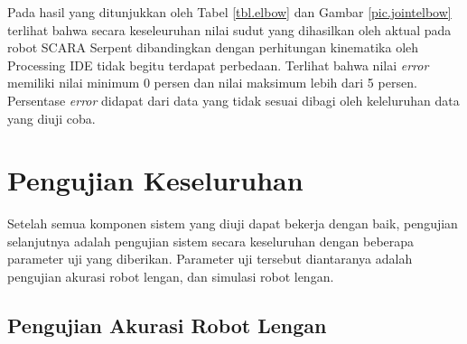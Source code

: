 Pada hasil yang ditunjukkan oleh Tabel \ref{tbl.elbow} dan Gambar \ref{pic.jointelbow} terlihat bahwa secara keseleuruhan nilai sudut yang dihasilkan oleh aktual pada robot SCARA Serpent dibandingkan dengan perhitungan kinematika oleh Processing IDE tidak begitu terdapat perbedaan. Terlihat bahwa nilai \textit{error}
memiliki nilai minimum 0 persen dan nilai maksimum lebih dari 5 persen. Persentase \textit{error} didapat dari data yang tidak sesuai dibagi oleh keleluruhan data yang diuji coba. 


\section{Pengujian Keseluruhan}
Setelah semua komponen sistem yang diuji dapat bekerja dengan baik, pengujian selanjutnya adalah pengujian sistem secara keseluruhan dengan beberapa parameter uji yang diberikan. Parameter uji tersebut diantaranya adalah pengujian akurasi robot lengan, dan simulasi robot lengan. 

\subsection{Pengujian Akurasi Robot Lengan}

